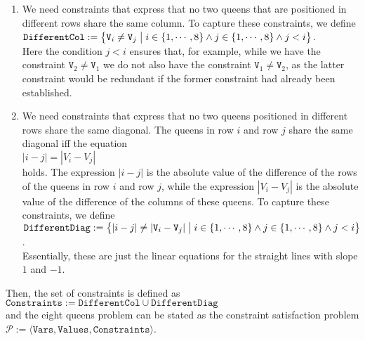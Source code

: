 \begin{enumerate}
\item We need constraints that express that no two queens that are positioned in different rows share the same
      column.  To capture these constraints, we define
      \\[0.2cm]
      \hspace*{1.3cm}
      $\texttt{DifferentCol} := \bigl\{ \texttt{V}_i \not= \texttt{V}_j \bigm| i \in \{1,\cdots,8\} \wedge j \in \{1,\cdots,8\} \wedge j < i \bigr\}$.
      \\[0.2cm]
      Here the condition $j < i$ ensures that, for example,  while we have the constraint
      $\texttt{V}_2 \not=
      \texttt{V}_1$ we do not also have the constraint  $\texttt{V}_1 \not= \texttt{V}_2$, as the latter 
      constraint would be redundant if the former constraint had already been established.
\item We need constraints that express that no two queens positioned in different rows share the same 
      diagonal.  The queens in row $i$ and row $j$ share the same diagonal iff the equation
      \\[0.2cm]
      \hspace*{1.3cm}
      $|i - j| = |V_i - V_j|$
      \\[0.2cm]
      holds.  The expression $|i-j|$ is the absolute value of the difference of the rows of the queens in row
      $i$ and row $j$,  while the expression $|V_i - V_j|$ is the absolute value of the difference of the
      columns of these queens.  To capture these constraints, we define
      \\[0.2cm]
      \hspace*{1.3cm}
      $\texttt{DifferentDiag} := \bigl\{ |i  - j| \not= |\texttt{V}_i - \texttt{V}_j| \bigm| i \in \{1,\cdots,8\} \wedge j \in \{1,\cdots,8\} \wedge j < i \bigr\}$.
      \\[0.2cm]
      Essentially, these are just the linear equations for the straight lines with slope $1$ and $-1$.
\end{enumerate}
Then, the set of constraints is defined as 
\\[0.2cm]
\hspace*{1.3cm}
$\texttt{Constraints} := \texttt{DifferentCol} \cup \texttt{DifferentDiag}$
\\[0.2cm]
and the eight queens problem can be stated as the constraint satisfaction problem
\\[0.2cm]
\hspace*{1.3cm}
$\mathcal{P} := \langle \texttt{Vars}, \texttt{Values}, \texttt{Constraints} \rangle$.
